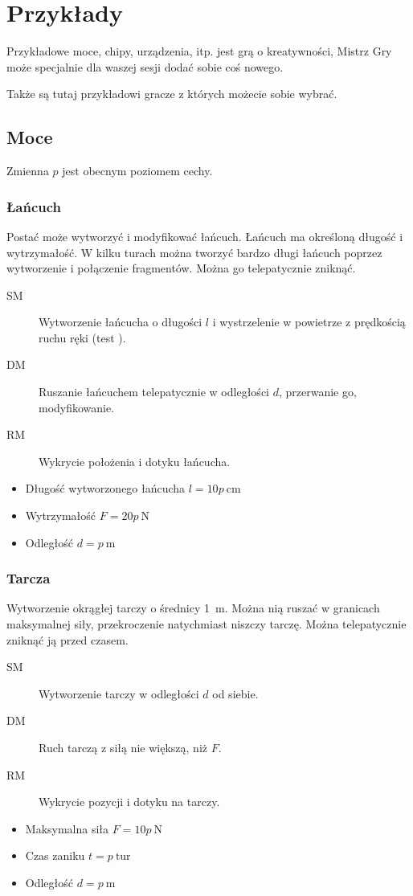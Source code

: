 \chapter{Przykłady}
Przykładowe moce, chipy, urządzenia, itp.
\kosmoramus{} jest grą o kreatywności, Mistrz Gry może specjalnie dla waszej sesji dodać sobie coś nowego.

Także są tutaj przykładowi gracze z których możecie sobie wybrać.

\section{Moce}
Zmienna $p$ jest obecnym poziomem cechy.

\subsection{Łańcuch}
Postać może wytworzyć i modyfikować łańcuch.
Łańcuch ma określoną długość i wytrzymałość.
W kilku turach można tworzyć bardzo długi łańcuch poprzez wytworzenie i połączenie fragmentów.
Można go telepatycznie zniknąć.
\begin{description}
	\item[SM] Wytworzenie łańcucha o długości $l$ i wystrzelenie w powietrze z prędkością ruchu ręki (test \aba{}).
	\item[DM] Ruszanie łańcuchem telepatycznie w odległości $d$, przerwanie go, modyfikowanie.
	\item[RM] Wykrycie położenia i dotyku łańcucha.
\end{description}
\begin{itemize}
	\item Długość wytworzonego łańcucha $l = 10p \ \si{\centi\metre}$
	\item Wytrzymałość $F = 20p \ \si{\newton}$
	\item Odległość $d = p \ \si{\metre}$
\end{itemize}

\subsection{Tarcza}
Wytworzenie okrągłej tarczy o średnicy \SI{1}{\metre}.
Można nią ruszać w granicach maksymalnej siły, przekroczenie natychmiast niszczy tarczę.
Można telepatycznie zniknąć ją przed czasem.
\begin{description}
	\item[SM] Wytworzenie tarczy w odległości $d$ od siebie.
	\item[DM] Ruch tarczą z siłą nie większą, niż $F$.
	\item[RM] Wykrycie pozycji i dotyku na tarczy.
\end{description}
\begin{itemize}
	\item Maksymalna siła $F = 10p \ \si{\newton}$
	\item Czas zaniku $t = p \ \text{tur}$
	\item Odległość $d = p \ \si{\metre}$
\end{itemize}


